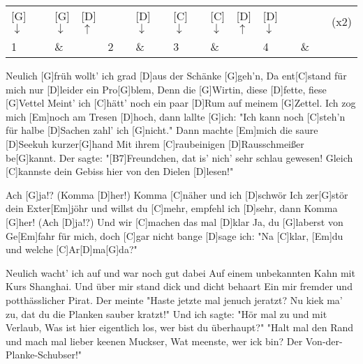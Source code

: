 


\begin{guitar}
	\newcommand{\up}{$\uparrow$}%
	\newcommand{\down}{$\downarrow$}%
	{\footnotesize \setlength{\tabcolsep}{3pt} \begin{tabular}{*{4}{*{4}{p{1.5mm}}|}c}
		[G]\down	& ~	& [G]\down	& [D]\up	&
					&	& [D]\down 	&			&
		[C]\down 	&	& [C]\down	& [D]\up	& 
		[D]\down	&	&			&			& (x2) \\
		1			&	& \&		&			& 
		2			&	& \&		&			& 
		3			&	& \&		&			& 
		4			&	& \&		&			&
	\end{tabular}%
	}%
	
	Neulich [G]früh wollt' ich grad [D]aus der Schänke [G]geh'n,
	Da ent[C]stand für mich nur [D]leider ein Pro[G]blem,
	Denn die [G]Wirtin, diese [D]fette, fiese [G]Vettel
	Meint' ich [C]hätt' noch ein paar [D]Rum auf meinem [G]Zettel.
	Ich zog mich [Em]noch am Tresen [D]hoch, dann lallte [G]ich:
	"Ich kann noch [C]steh'n für halbe [D]Sachen zahl' ich [G]nicht."
	Dann machte [Em]mich die saure [D]Seekuh kurzer[G]hand
	Mit ihrem [C]raubeinigen [D]Rausschmeißer be[G]kannt.
	Der sagte: "[B7]Freundchen, dat is' nich' sehr schlau gewesen!
	Gleich [C]kannste dein Gebiss hier von den Dielen [D]lesen!"
	
	Ach [G]ja!? (Komma [D]her!) Komma [C]näher und ich [D]schwör
	Ich zer[G]stör dein Exter[Em]jöhr und willst du [C]mehr, empfehl ich [D]sehr, dann
	Komma [G]her! (Ach [D]ja!?) Und wir [C]machen das mal [D]klar
	Ja, du [G]laberst von Ge[Em]fahr für mich, doch [C]gar nicht bange [D]sage ich:
	"Na [C]klar, [Em]du und welche [C]Ar[D]ma[G]da?"
	
	\pagebreak
	
	Neulich wacht' ich auf und war noch gut dabei
	Auf einem unbekannten Kahn mit Kurs Shanghai.
	Und über mir stand dick und dicht behaart
	Ein mir fremder und potthässlicher Pirat.
	Der meinte "Haste jetzte mal jenuch jeratzt?
	Nu kiek ma' zu, dat du die Planken sauber kratzt!"
	Und ich sagte: "Hör mal zu und mit Verlaub,
	Was ist hier eigentlich los, wer bist du überhaupt?"
	"Halt mal den Rand und mach mal lieber keenen Muckser,
	Wat meenste, wer ick bin? Der Von-der-Planke-Schubser!"
	
	 
		

\end{guitar}
